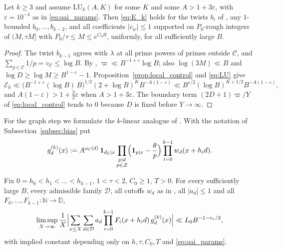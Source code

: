 \begin{theorem}
\label{thm:centering_k}
Let $k\ge3$ and assume $\mathrm{LU}_k(A,K)$ for some $K$ and some $A>1+3\varepsilon$, with $\varepsilon=10^{-4}$ as in \eqref{eq:oai_params}. Then \eqref{eq:E_k} holds for the twists $b_i$ of \cite[(12.3), p.~51]{OpenAI2026}, any $1$-bounded $b_0,\dots,b_{k-2}$, and all coefficients $|c_w|\le1$ supported on $P_0$-rough integers of $(M,\tau M]$ with $P_0/\tau\le M\le e^{C_0B}$, uniformly, for all sufficiently large $B$.
\end{theorem}

\begin{proof}
The twist $b_{k-1}$ agrees with $\lambda$ at all prime powers of primes outside $\mathcal C$, and $\sum_{p\in\mathcal C}1/p=v_{\mathcal C}\le\log B$. By \cite[(12.13), p.~53]{OpenAI2026}, $\varpi\ll B^{-1+\varepsilon}\log B$; also $\log(3M)\ll B$ and $\log D\ge\log M\ge B^{1-\varepsilon}-1$. Proposition~\ref{prop:local_control} and \eqref{eq:LU} give
\begin{equation}
\mathcal E_k\ll\bigl(B^{-1+\varepsilon}(\log B)\,B\bigr)^{1/2}(2+\log B)^K B^{-A(1-\varepsilon)}\ll B^{\varepsilon/2}(\log B)^{K+1/2}B^{-A(1-\varepsilon)},
\label{eq:Ek_bound}
\end{equation}
and $A(1-\varepsilon)>1+\frac32\varepsilon$ when $A>1+3\varepsilon$. The boundary term $(2D+1)\varpi/Y$ of \eqref{eq:local_control} tends to $0$ because $D$ is fixed before $Y\to\infty$.
\end{proof}

For the graph step we formulate the $k$-linear analogue of \cite[Proposition~10.1, p.~45]{OpenAI2026}. With the notation of Subsection~\ref{subsec:bias} put
\begin{equation}
g^{(k)}_d(x):=A^{\omega_{\mathcal C}(d)}\,\mathbf 1_{d_{\mathcal C}\mid x}\prod_{\substack{p\mid d\\ p\in\mathcal Z}}\Bigl(\mathbf 1_{p\mid x}-\frac\theta p\Bigr)\prod_{i=0}^{k-1}w_d(x+h_id).
\label{eq:gk}
\end{equation}

\begin{hypothesis}
\label{hyp:G}
Fix $0=h_0<h_1<\dots<h_{k-1}$, $1<\tau<2$, $C_0\ge1$, $T>0$. For every sufficiently large $B$, every admissible family $\mathcal D$, all cutoffs $w_d$ as in \cite[(10.4)]{OpenAI2026}, all $|a_d|\le1$ and all $F_0,\dots,F_{k-1}:\mathbb N\to\mathbb D$,
\begin{equation}
\limsup_{X\to\infty}\frac1X\Bigl|\sum_{x\le X}\sum_{d\in\mathcal D}a_d\prod_{i=0}^{k-1}F_i(x+h_id)\,g^{(k)}_d(x)\Bigr|\ll L_0B^{-1-c_*/2},
\label{eq:Gk}
\end{equation}
with implied constant depending only on $h,\tau,C_0,T$ and \eqref{eq:oai_params}.
\end{hypothesis}

